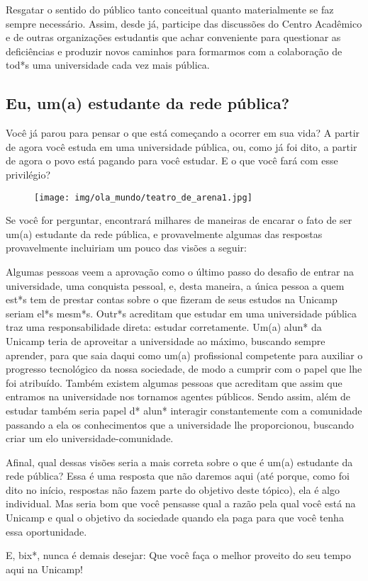 Resgatar o sentido do público tanto conceitual quanto materialmente se faz
sempre necessário. Assim, desde já, participe das discussões do Centro
Acadêmico e de outras organizações estudantis que achar conveniente para
questionar as deficiências e produzir novos caminhos para formarmos com a
colaboração de tod*s uma universidade cada vez mais pública.

\subsection*{Eu, um(a) estudante da rede pública?}

Você já parou para pensar o que está começando a ocorrer em sua vida? A partir
de agora você estuda em uma universidade pública, ou, como já foi dito, a
partir de agora o povo está pagando para você estudar. E o que você fará com
esse privilégio?

\begin{figure}[h!]
    \centering
    \texttt{[image: img/ola\_mundo/teatro\_de\_arena1.jpg]}
\end{figure}

Se você for perguntar, encontrará milhares de maneiras de encarar o fato de ser
um(a) estudante da rede pública, e provavelmente algumas das respostas
provavelmente incluiriam um pouco das visões a seguir:

Algumas pessoas veem a aprovação como o último passo do desafio de entrar na
universidade, uma conquista pessoal, e, desta maneira, a única pessoa a quem
est*s tem de prestar contas sobre o que fizeram de seus estudos na Unicamp
seriam el*s mesm*s. Outr*s acreditam que estudar em uma universidade pública
traz uma responsabilidade direta: estudar corretamente. Um(a) alun* da Unicamp
teria de aproveitar a universidade ao máximo, buscando sempre aprender, para
que saia daqui como um(a) profissional competente para auxiliar o progresso
tecnológico da nossa sociedade, de modo a cumprir com o papel que lhe foi
atribuído. Também existem algumas pessoas que acreditam que assim que entramos
na universidade nos tornamos agentes públicos. Sendo assim, além de estudar
também seria papel d* alun* interagir constantemente com a comunidade passando
a ela os conhecimentos que a universidade lhe proporcionou, buscando criar um
elo universidade-comunidade.

Afinal, qual dessas visões seria a mais correta sobre o que é um(a) estudante
da rede pública? Essa é uma resposta que não daremos aqui (até porque, como
foi dito no início, respostas não fazem parte do objetivo deste tópico), ela é
algo individual. Mas seria bom que você pensasse qual a razão pela qual você
está na Unicamp e qual o objetivo da sociedade quando ela paga para que você
tenha essa oportunidade.

E, bix*, nunca é demais desejar: Que você faça o melhor proveito do seu tempo
aqui na Unicamp!
